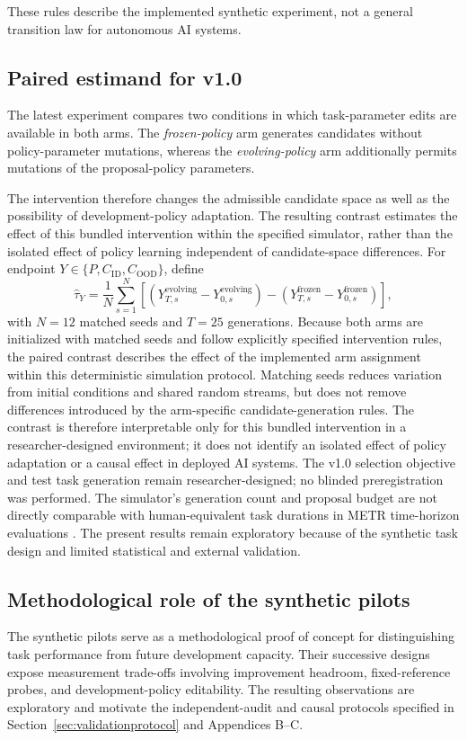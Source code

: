 \documentclass[11pt,a4paper]{article}
\newcommand{\id}{\mathrm{ID}}
\newcommand{\ood}{\mathrm{OOD}}
\begin{document}
These rules describe the implemented synthetic experiment, not a general transition law for autonomous AI systems.

\subsection{Paired estimand for v1.0}
The latest experiment compares two conditions in which task-parameter edits are available in both arms.
The \emph{frozen-policy} arm generates candidates without policy-parameter mutations, whereas the
\emph{evolving-policy} arm additionally permits mutations of the proposal-policy parameters.

The intervention therefore changes the admissible candidate space as well as the possibility of
development-policy adaptation. The resulting contrast estimates the effect of this bundled intervention
within the specified simulator, rather than the isolated effect of policy learning independent of
candidate-space differences. For endpoint $Y\in\{P,C_{\id},C_{\ood}\}$, define
\begin{equation}
\widehat\tau_Y=\frac{1}{N}\sum_{s=1}^{N}\left[(Y^{\mathrm{evolving}}_{T,s}-Y^{\mathrm{evolving}}_{0,s})-(Y^{\mathrm{frozen}}_{T,s}-Y^{\mathrm{frozen}}_{0,s})\right],\label{eq:paired}
\end{equation} with $N=12$ matched seeds and $T=25$ generations. Because both arms are initialized with matched seeds and follow explicitly specified intervention rules, the paired contrast describes the effect of the implemented arm assignment within this deterministic simulation protocol. Matching seeds reduces variation from initial conditions and shared random streams, but does not remove differences introduced by the arm-specific candidate-generation rules. The contrast is therefore interpretable only for this bundled intervention in a researcher-designed environment; it does not identify an isolated effect of policy adaptation or a causal effect in deployed AI systems.
The v1.0 selection objective and test task generation remain researcher-designed; no blinded preregistration was performed. The simulator's generation count and proposal budget are not directly comparable with human-equivalent task durations in METR time-horizon evaluations \cite{metr2025measuring,metr2026timehorizon}. The present results remain exploratory because of the synthetic task design and limited statistical and external validation.

\subsection{Methodological role of the synthetic pilots}
The synthetic pilots serve as a methodological proof of concept for distinguishing task performance from future development capacity. Their successive designs expose measurement trade-offs involving improvement headroom, fixed-reference probes, and development-policy editability. The resulting observations are exploratory and motivate the independent-audit and causal protocols specified in
Section~\ref{sec:validationprotocol} and Appendices B--C.
\end{document}
